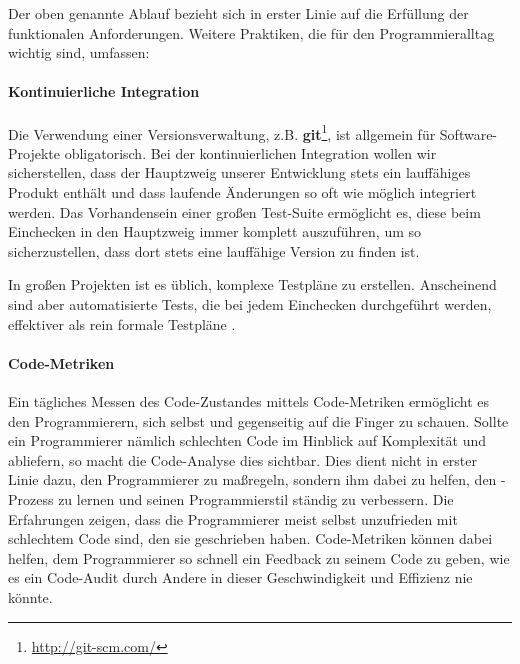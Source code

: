 Der oben genannte Ablauf bezieht sich in erster Linie auf die Erfüllung der funktionalen Anforderungen. Weitere Praktiken, die für den Programmieralltag wichtig sind, umfassen:

\paragraph{Kontinuierliche Integration} Die Verwendung einer Versionsverwaltung, z.B. \textbf{git}\footnote{\url{http://git-scm.com/}}, ist allgemein für Software-Projekte obligatorisch. Bei der kontinuierlichen Integration wollen wir sicherstellen, dass der Hauptzweig unserer Entwicklung stets ein lauffähiges Produkt enthält und dass laufende Änderungen so oft wie möglich integriert werden. Das Vorhandensein einer großen Test-Suite ermöglicht es, diese beim Einchecken in den Hauptzweig immer komplett auszuführen, um so sicherzustellen, dass dort stets eine lauffähige Version zu finden ist.

In großen Projekten ist es üblich, komplexe Testpläne zu erstellen. Anscheinend sind aber automatisierte Tests, die bei jedem Einchecken durchgeführt werden, effektiver als rein formale Testpläne \citep[S. 238]{hunt_pragmatic_1999}.

\paragraph{Code-Metriken} Ein tägliches Messen des Code-Zustandes mittels Code-Metriken ermöglicht es den Programmierern, sich selbst und gegenseitig auf die Finger zu schauen. Sollte ein Programmierer nämlich schlechten Code im Hinblick auf Komplexität und  abliefern, so macht die Code-Analyse dies sichtbar. Dies dient nicht in erster Linie dazu, den Programmierer zu maßregeln, sondern ihm dabei zu helfen, den -Prozess zu lernen und seinen Programmierstil ständig zu verbessern. Die Erfahrungen zeigen, dass die Programmierer meist selbst unzufrieden mit schlechtem Code sind, den sie geschrieben haben. Code-Metriken können dabei helfen, dem Programmierer so schnell ein Feedback zu seinem Code zu geben, wie es ein Code-Audit durch Andere in dieser Geschwindigkeit und Effizienz nie könnte.

